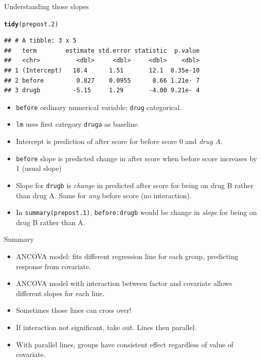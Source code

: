\documentclass[unknownkeysallowed]{beamer}\usepackage[]{graphicx}\usepackage[]{color}
\makeatletter
\newcommand{\hlstd}[1]{\textcolor[rgb]{0.345,0.345,0.345}{#1}}%
\newcommand{\hlkwd}[1]{\textcolor[rgb]{0.737,0.353,0.396}{\textbf{#1}}}%
\newenvironment{kframe}{%
 \def\at@end@of@kframe{}%
 \ifinner\ifhmode%
  \def\at@end@of@kframe{\end{minipage}}%
  \begin{minipage}{\columnwidth}%
 \fi\fi%
 \def\FrameCommand##1{\hskip\@totalleftmargin \hskip-\fboxsep
 \colorbox{shadecolor}{##1}\hskip-\fboxsep
     \hskip-\linewidth \hskip-\@totalleftmargin \hskip\columnwidth}%
 \MakeFramed {\advance\hsize-\width
   \@totalleftmargin\z@ \linewidth\hsize
   \@setminipage}}%
 {\par\unskip\endMakeFramed%
 \at@end@of@kframe}
\newenvironment{knitrout}{}{} %
\makeatother
\begin{document}
\begin{frame}[fragile]{Understanding those slopes}
  
\begin{knitrout}\footnotesize
{}\color{fgcolor}\begin{kframe}
\begin{alltt}
\hlkwd{tidy}\hlstd{(prepost.2)}
\end{alltt}
\begin{verbatim}
## # A tibble: 3 x 5
##   term        estimate std.error statistic  p.value
##   <chr>          <dbl>     <dbl>     <dbl>    <dbl>
## 1 (Intercept)   18.4      1.51       12.1  8.35e-10
## 2 before         0.827    0.0955      8.66 1.21e- 7
## 3 drugb         -5.15     1.29       -4.00 9.21e- 4
\end{verbatim}
\end{kframe}
\end{knitrout}

\begin{itemize}
\item \texttt{before} ordinary numerical variable; \texttt{drug}
  categorical. 
\item \texttt{lm} uses first category \texttt{druga} as baseline.
\item Intercept is prediction of after score for before score 0 and
  \emph{drug A}.
\item \texttt{before} slope is predicted change in after score when
  before score increases by 1 (usual slope)
\item Slope for \texttt{drugb} is \emph{change} in predicted after
  score for being on drug B rather than drug A. Same for \emph{any}
  before score (no interaction).
\item In \texttt{summary(prepost.1)}, \texttt{before:drugb} would be change in
  \emph{slope} for being on drug B rather than A.
  
\end{itemize}

  
\end{frame}

\begin{frame}[fragile]{Summary}

  \begin{itemize}
  \item ANCOVA model: fits different regression line for each group,
    predicting response from covariate.
  \item ANCOVA model with interaction between factor and covariate
    allows different slopes for each line.
  \item Sometimes those lines can cross over!
  \item If interaction not significant, take out. Lines then parallel.
  \item With parallel lines, groups have consistent effect regardless
    of value of covariate.
  \end{itemize}


  
\end{frame}
\end{document}

